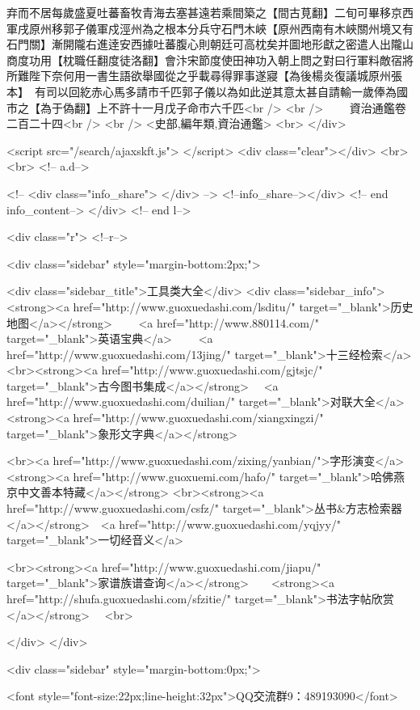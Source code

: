 弃而不居每歲盛夏吐蕃畜牧青海去塞甚遠若乘間築之【間古莧翻】二旬可畢移京西軍戌原州移郭子儀軍戍涇州為之根本分兵守石門木峽【原州西南有木峽關州境又有石門關】漸開隴右進逹安西據吐蕃腹心則朝廷可高枕矣并圖地形獻之密遣人出隴山商度功用【枕職任翻度徒洛翻】會汴宋節度使田神功入朝上問之對曰行軍料敵宿將所難陛下奈何用一書生語欲舉國從之乎載尋得罪事遂寢【為後楊炎復議城原州張本】　有司以回紇赤心馬多請市千匹郭子儀以為如此逆其意太甚自請輸一歲俸為國市之【為于偽翻】上不許十一月戊子命市六千匹<br />
<br />
　　資治通鑑卷二百二十四<br />
<br />
<史部,編年類,資治通鑑>  <br>
   </div> 

<script src="/search/ajaxskft.js"> </script>
 <div class="clear"></div>
<br>
<br>
 <!-- a.d-->

 <!--
<div class="info_share">
</div> 
-->
 <!--info_share--></div>   <!-- end info_content-->
  </div> <!-- end l-->

<div class="r">   <!--r-->



<div class="sidebar"  style="margin-bottom:2px;">

 
<div class="sidebar_title">工具类大全</div>
<div class="sidebar_info">
<strong><a href="http://www.guoxuedashi.com/lsditu/" target="_blank">历史地图</a></strong>　　
<a href="http://www.880114.com/" target="_blank">英语宝典</a>　　
<a href="http://www.guoxuedashi.com/13jing/" target="_blank">十三经检索</a>　
<br><strong><a href="http://www.guoxuedashi.com/gjtsjc/" target="_blank">古今图书集成</a></strong>　
<a href="http://www.guoxuedashi.com/duilian/" target="_blank">对联大全</a>　<strong><a href="http://www.guoxuedashi.com/xiangxingzi/" target="_blank">象形文字典</a></strong>　

<br><a href="http://www.guoxuedashi.com/zixing/yanbian/">字形演变</a>　　<strong><a href="http://www.guoxuemi.com/hafo/" target="_blank">哈佛燕京中文善本特藏</a></strong>
<br><strong><a href="http://www.guoxuedashi.com/csfz/" target="_blank">丛书&方志检索器</a></strong>　<a href="http://www.guoxuedashi.com/yqjyy/" target="_blank">一切经音义</a>　　

<br><strong><a href="http://www.guoxuedashi.com/jiapu/" target="_blank">家谱族谱查询</a></strong>　　<strong><a href="http://shufa.guoxuedashi.com/sfzitie/" target="_blank">书法字帖欣赏</a></strong>　
<br>

</div>
</div>


<div class="sidebar" style="margin-bottom:0px;">

<font style="font-size:22px;line-height:32px">QQ交流群9：489193090</font>


